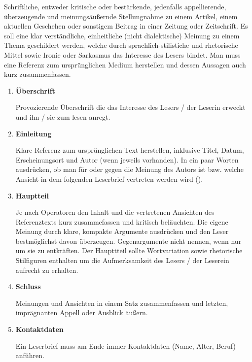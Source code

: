 



\thispagestyle{plain}




Schriftliche, entweder kritische oder best\"{a}rkende, jedenfalls appellierende, \"{u}berzeugende und meinungs\"{a}u\ss{}ernde Stellungnahme zu einem Artikel, einem aktuellen Geschehen oder sonstigem Beitrag in einer Zeitung oder Zeitschrift. Es soll eine klar verst\"{a}ndliche, einheitliche (nicht dialektische) Meinung zu einem Thema geschildert werden, welche durch sprachlich-stilistiche und rhetorische Mittel sowie Ironie oder Sarkasmus das Interesse des Lesers bindet. Man muss eine Referenz zum urspr\"{u}nglichen Medium herstellen und dessen Aussagen auch kurz zusammenfassen.


\begin{enumerate}
  \item \textbf{\"{U}berschrift}
  \par
        Provozierende \"{U}berschrift die das Interesse des Lesers / der Leserin erweckt und ihn / sie zum lesen anregt.

  \item \textbf{Einleitung}
  \par
  Klare Referenz zum urspr\"{u}nglichen Text herstellen, inklusive Titel, Datum, Erscheinungsort und Autor (wenn jeweils vorhanden). In ein paar Worten ausdr\"{u}cken, ob man f\"{u}r oder gegen die Meinung des Autors ist bzw. welche Ansicht in dem folgenden Leserbrief vertreten werden wird ().

  \item \textbf{Hauptteil}
  \par
  Je nach Operatoren den Inhalt und die vertretenen Ansichten des Referenztexts kurz zusammefassen und kritisch bel\"{a}uchten. Die eigene Meinung durch klare, kompakte Argumente ausdr\"{u}cken und den Leser bestm\"{o}glichst davon \"{u}berzeugen. Gegenargumente nicht nennen, wenn nur um sie zu entkr\"{a}ften. Der Haupttteil sollte Wortvariation sowie rhetorische Stilfiguren enthalten um die Aufmerksamkeit des Lesers / der Leserein aufrecht zu erhalten.

  \item \textbf{Schluss}
  \par
  Meinungen und Ansichten in einem Satz zusammenfassen und letzten, impr\"{a}gnanten Appell oder Ausblick \"{a}u\ss{}ern.

  \item \textbf{Kontaktdaten}

  Ein Leserbrief muss am Ende immer Kontaktdaten (Name, Alter, Beruf) anf\"{u}hren.

\end{enumerate}

